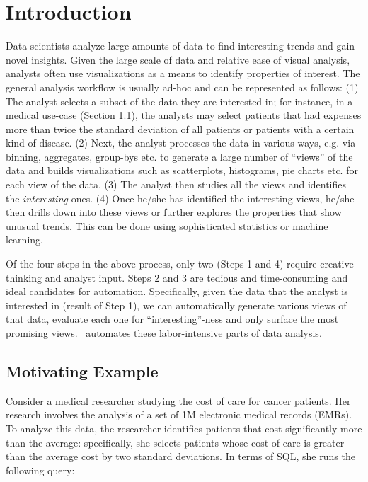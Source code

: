 \section{Introduction}
\label{sec:intro}
Data scientists analyze large amounts of data to find interesting trends and
gain novel insights. Given the large scale of data and relative ease of visual
analysis, analysts often use visualizations as a means to identify properties of
interest. The general analysis workflow is usually ad-hoc and can be represented
as follows: (1) The analyst selects a subset of the data they are interested
in; for instance, in a medical use-case (Section
\ref{subsec:motivation_example}), the analysts may select patients that had
expenses more than twice the standard deviation of all patients or patients
with a certain kind of disease. (2) Next, the analyst processes the data in
various ways, e.g. via binning, aggregates, group-bys etc. to generate a large
number of ``views'' of the data and builds visualizations such as scatterplots,
histograms, pie charts etc. for each view of the data. (3) The analyst then
studies all the views and identifies the {\it interesting} ones. (4) Once he/she
has identified the interesting views, he/she then drills down into these views
or further explores the properties that show unusual trends. This can be done
using sophisticated statistics or machine learning.

Of the four steps in the above process, only two (Steps 1 and 4) require
creative thinking and analyst input. Steps 2 and 3 are tedious and
time-consuming and ideal candidates for automation. Specifically, given the data that the analyst
is interested in (result of Step 1), we can automatically generate various
views of that data, evaluate each one for ``interesting''-ness and only surface
the most promising views. \SeeDB\ automates these labor-intensive parts of data
analysis.

\subsection{Motivating Example}
\label{subsec:motivation_example}

Consider a medical researcher studying the cost of care for cancer patients. Her
research involves the analysis of a set of 1M electronic medical records (EMRs).
To analyze this data, the researcher identifies patients that cost
significantly more than the average: specifically, she selects patients whose
cost of care is greater than the average cost by two standard deviations. In
terms of SQL, she runs the following query: \\


